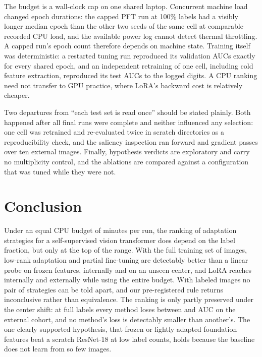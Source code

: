 \documentclass[conference,a4paper]{IEEEtran}
\begin{document}
The budget is a wall-clock cap on one shared laptop. Concurrent machine load
changed epoch durations: the capped PFT run at 100\% labels had a visibly longer
median epoch than the other two seeds of the same cell at comparable recorded
CPU load, and the available power log cannot detect thermal throttling.
A capped run's epoch count therefore depends on machine state. Training itself
was deterministic: a restarted tuning run reproduced its validation AUCs exactly
for every shared epoch, and an independent retraining of one cell, including
cold feature extraction, reproduced its test AUCs to the logged digits. A CPU
ranking need not transfer to GPU practice, where LoRA's backward cost is
relatively cheaper.

Two departures from ``each test set is read once'' should be stated plainly.
Both happened after all final runs were complete and neither influenced any
selection: one cell was retrained and re-evaluated twice in scratch directories
as a reproducibility check, and the saliency inspection ran forward and gradient
passes over ten external images. Finally, hypothesis verdicts are exploratory
and carry no multiplicity control, and the ablations are compared against a
configuration that was tuned while they were not.

\section{Conclusion}
\label{sec:conclusion}

Under an equal CPU budget of \valProtocolCapMinutes minutes per run, the ranking
of adaptation strategies for a self-supervised vision transformer does depend on
the label fraction, but only at the top of the range. With the full training set
of \valDataBusiTrain images, low-rank adaptation and partial fine-tuning are
detectably better than a linear probe on frozen features, internally and on an
unseen center, and LoRA reaches \valMainLoRAHundredAucIn internally and
\valMainLoRAHundredAucOut externally while using the entire budget. With
\valDataSubsetOneN labeled images no pair of strategies can be told apart, and
our pre-registered rule returns inconclusive rather than equivalence. The
ranking is only partly preserved under the center shift: at full labels every
method loses between \valMainLoRAHundredGapMean and \valMainLPHundredGapMean AUC
on the external cohort, and no method's loss is detectably smaller than
another's. The
one clearly supported hypothesis, that frozen or lightly adapted foundation
features beat a scratch ResNet-18 at low label counts, holds because the
baseline does not learn from so few images.
\end{document}
